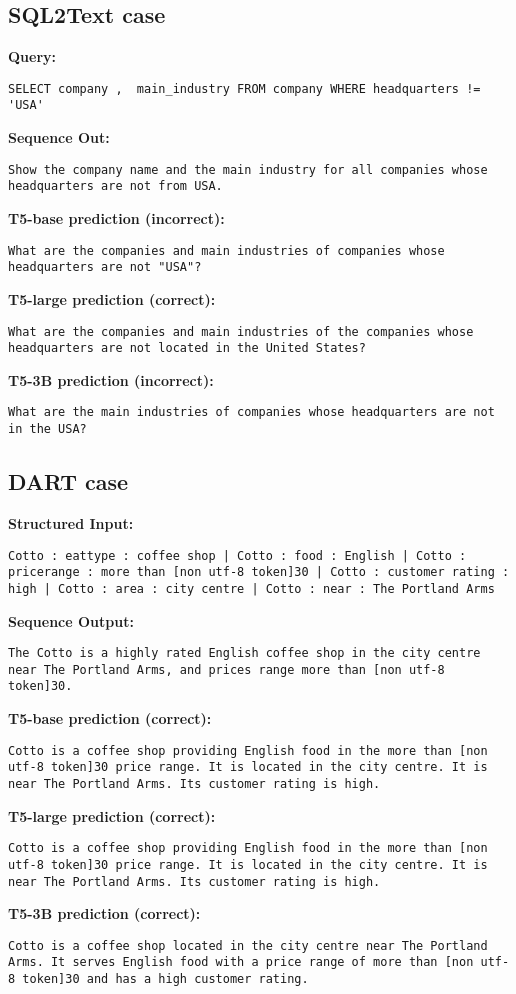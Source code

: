 \documentclass[11pt]{article}
\begin{document}
\subsection{SQL2Text case}
\label{app:sql2text_case}
\textbf{Query: }
\begin{lstlisting}
SELECT company ,  main_industry FROM company WHERE headquarters != 'USA'
\end{lstlisting}
\textbf{Sequence Out: }
\begin{lstlisting}
Show the company name and the main industry for all companies whose headquarters are not from USA.
\end{lstlisting}
\textbf{T5-base prediction (incorrect):} 
\begin{lstlisting}
What are the companies and main industries of companies whose headquarters are not "USA"?
\end{lstlisting}
\textbf{T5-large prediction (correct):} 
\begin{lstlisting}
What are the companies and main industries of the companies whose headquarters are not located in the United States?
\end{lstlisting}
\textbf{T5-3B prediction (incorrect):} 
\begin{lstlisting}
What are the main industries of companies whose headquarters are not in the USA?
\end{lstlisting}

\subsection{DART case}
\label{app:dart_case}
\textbf{Structured Input:} 
\begin{lstlisting}
Cotto : eattype : coffee shop | Cotto : food : English | Cotto : pricerange : more than [non utf-8 token]30 | Cotto : customer rating : high | Cotto : area : city centre | Cotto : near : The Portland Arms
\end{lstlisting}
\textbf{Sequence Output:} 
\begin{lstlisting}
The Cotto is a highly rated English coffee shop in the city centre near The Portland Arms, and prices range more than [non utf-8 token]30.
\end{lstlisting}
\textbf{T5-base prediction (correct):} 
\begin{lstlisting}
Cotto is a coffee shop providing English food in the more than [non utf-8 token]30 price range. It is located in the city centre. It is near The Portland Arms. Its customer rating is high.
\end{lstlisting}
\textbf{T5-large prediction (correct):} 
\begin{lstlisting}
Cotto is a coffee shop providing English food in the more than [non utf-8 token]30 price range. It is located in the city centre. It is near The Portland Arms. Its customer rating is high.
\end{lstlisting}
\textbf{T5-3B prediction (correct):} 
\begin{lstlisting}
Cotto is a coffee shop located in the city centre near The Portland Arms. It serves English food with a price range of more than [non utf-8 token]30 and has a high customer rating.
\end{lstlisting}
\end{document}
